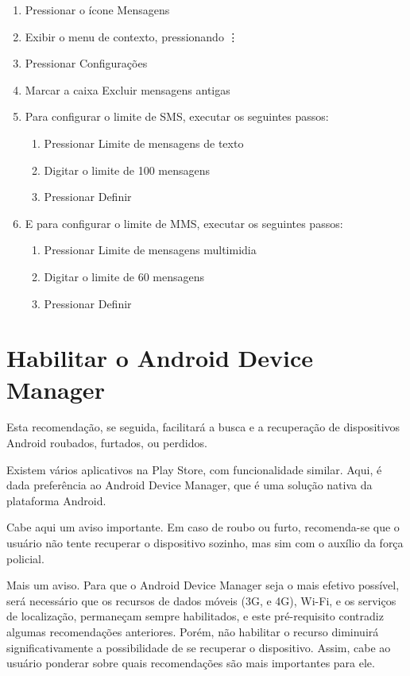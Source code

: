\begin{enumerate}
\item Pressionar o \'icone Mensagens
\item Exibir o menu de contexto, pressionando \vdots 
\item Pressionar Configura\c c\~oes
\item Marcar a caixa Excluir mensagens antigas
\item Para configurar o limite de SMS, executar os seguintes passos:
  \begin{enumerate}
  \item Pressionar Limite de mensagens de texto
  \item Digitar o limite de 100 mensagens
  \item Pressionar Definir
  \end{enumerate}
\item E para configurar o limite de MMS, executar os seguintes passos:
  \begin{enumerate}
  \item Pressionar Limite de mensagens multimidia
  \item Digitar o limite de 60 mensagens
  \item Pressionar Definir
\end{enumerate}

\end{enumerate}

\section{Habilitar o Android Device Manager}

Esta recomenda\c c\~ao, se seguida, facilitar\'a a busca e a recupera\c c\~ao de dispositivos Android roubados, furtados, ou perdidos. 

Existem v\'arios aplicativos na Play Store, com funcionalidade similar. Aqui, \'e dada prefer\^encia ao Android Device Manager, que \'e uma solu\c c\~ao nativa da plataforma Android.

Cabe aqui um aviso importante. Em caso de roubo ou furto, recomenda-se que o usu\'ario n\~ao tente recuperar o dispositivo sozinho, mas sim com o aux\'ilio da for\c ca policial.

Mais um aviso. Para que o Android Device Manager seja o mais efetivo poss\'ivel, ser\'a necess\'ario que os recursos de dados m\'oveis (3G, e 4G), Wi-Fi, e os servi\c cos de localiza\c c\~ao, permane\c cam sempre habilitados, e este pr\'e-requisito contradiz algumas recomenda\c c\~oes anteriores. Por\'em, n\~ao habilitar o recurso diminuir\'a significativamente a possibilidade de se recuperar o dispositivo. Assim, cabe ao usu\'ario ponderar sobre quais recomenda\c c\~oes s\~ao mais importantes para ele.

